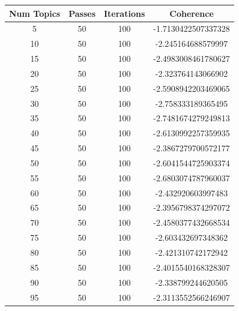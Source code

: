 \documentclass{report}
\begin{document}
{                \begin{longtable}{|c|c|c|c|}
                    \hline
                    \textbf{Num Topics} & \textbf{Passes} & \textbf{Iterations} & \textbf{Coherence} \\
                    \hline
                    5 & 50 & 100 & -1.7130422507337328 \\
                    \hline
                    10 & 50 & 100 & -2.245164688579997 \\
                    \hline
                    15 & 50 & 100 & -2.4983008461780627 \\
                    \hline
                    20 & 50 & 100 & -2.323764143066902 \\
                    \hline
                    25 & 50 & 100 & -2.5908942203469065 \\
                    \hline
                    30 & 50 & 100 & -2.758333189365495 \\
                    \hline
                    35 & 50 & 100 & -2.7481674279249813 \\
                    \hline
                    40 & 50 & 100 & -2.6130992257359935 \\
                    \hline
                    45 & 50 & 100 & -2.3867279700572177 \\
                    \hline
                    50 & 50 & 100 & -2.6041544725903374 \\
                    \hline
                    55 & 50 & 100 & -2.6803074787960037 \\
                    \hline
                    60 & 50 & 100 & -2.432920603997483 \\
                    \hline
                    65 & 50 & 100 & -2.3956798374297072 \\
                    \hline
                    70 & 50 & 100 & -2.4580377432668534 \\
                    \hline
                    75 & 50 & 100 & -2.603432697348362 \\
                    \hline
                    80 & 50 & 100 & -2.421310742172942 \\
                    \hline
                    85 & 50 & 100 & -2.4015540168328307 \\
                    \hline
                    90 & 50 & 100 & -2.338799244620505 \\
                    \hline
                    95 & 50 & 100 & -2.3113552566246907 \\

\end{longtable}}
\end{document}
